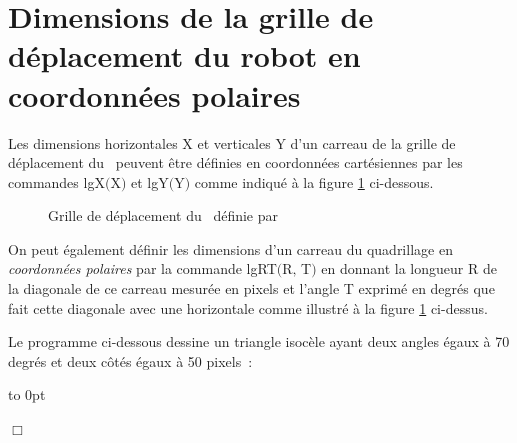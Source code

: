 \section{Dimensions de la grille de déplacement du robot en coordonnées polaires}
Les dimensions horizontales {\idt X} et verticales {\idt Y} d'un carreau de la grille de dé\-pla\-ce\-ment du
\robot\ peuvent être définies en coordonnées cartésiennes par les commandes
{\idt lgX$($X$)$} et {\idt lgY$($Y$)$} comme indiqué à la figure \ref{fig:lgrt} ci-dessous.

\begin{figure}[h]
 \parbox{13.7cm}{\caption{Grille de déplacement du \protect\robot\ définie par}\label{fig:lgrt}} 
\end{figure}

On peut également définir les dimensions d'un carreau du quadrillage en {\em coordonnées
polaires} par la commande
{\idt lgRT$($R$,\,$T$)$} en donnant la longueur {\idt R} de la diagonale de ce carreau mesurée
en pixels et
l'angle {\idt T}  exprimé en degrés que fait cette diagonale avec une horizontale
comme illustré à la figure \ref{fig:lgrt} ci-dessus.

\begin{exemple}{\rm
Le programme ci-dessous dessine un triangle isocèle ayant deux angles égaux
à 70 degrés et deux côtés égaux à 50 pixels~:

{\raggedright 
 \vbox to 0pt{}%
 
 }
\noindent $\Box$ }\end{exemple}


